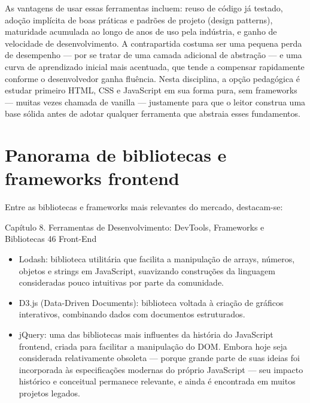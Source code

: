 As vantagens de usar essas ferramentas incluem: reuso de código já testado, adoção implícita de boas práticas e padrões de projeto (design patterns), maturidade acumulada ao longo de anos de uso pela indústria, e ganho de velocidade de desenvolvimento. A contrapartida costuma ser uma pequena perda de desempenho — por se tratar de uma camada adicional de abstração — e uma curva de aprendizado inicial mais acentuada, que tende a compensar rapidamente conforme o desenvolvedor ganha fluência. Nesta disciplina, a opção pedagógica é estudar primeiro HTML, CSS e JavaScript em sua forma pura, sem frameworks — muitas vezes chamada de vanilla — justamente para que o leitor construa uma base sólida antes de adotar qualquer ferramenta que abstraia esses fundamentos.

\section{Panorama de bibliotecas e frameworks frontend}

Entre as bibliotecas e frameworks mais relevantes do mercado, destacam-se:

Capítulo 8. Ferramentas de Desenvolvimento: DevTools, Frameworks e Bibliotecas 46 Front-End

\begin{itemize}
  \item Lodash: biblioteca utilitária que facilita a manipulação de arrays, números, objetos e strings em JavaScript, suavizando construções da linguagem consideradas pouco intuitivas por parte da comunidade.
\end{itemize}

\begin{itemize}
  \item D3.js (Data-Driven Documents): biblioteca voltada à criação de gráficos interativos, combinando dados com documentos estruturados.
\end{itemize}

\begin{itemize}
  \item jQuery: uma das bibliotecas mais influentes da história do JavaScript frontend, criada para facilitar a manipulação do DOM. Embora hoje seja considerada relativamente obsoleta — porque grande parte de suas ideias foi incorporada às especificações modernas do próprio JavaScript — seu impacto histórico e conceitual permanece relevante, e ainda é encontrada em muitos projetos legados.
\end{itemize}

